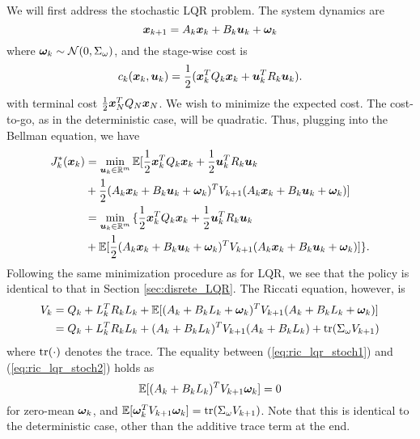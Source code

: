 We will first address the stochastic LQR problem. The system dynamics are
\begin{equation}
    \bm{x}_{k+1} = A_k \bm{x}_k + B_k \bm{u}_k + \bm{\omega}_{k}
\end{equation}
where $\bm{\omega}_{k} \sim \mathcal{N}(0, \Sigma_{\omega})$, and the stage-wise cost is 
\begin{equation}
    c_k(\bm{x}_k,\bm{u}_k) = \frac{1}{2} ( \bm{x}_k^T Q_k \bm{x}_k + \bm{u}_k^T R_k \bm{u}_k).
\end{equation}
with terminal cost $\frac{1}{2}\bm{x}_N^T Q_N \bm{x}_N$. We wish to minimize the expected cost. The cost-to-go, as in the deterministic case, will be quadratic. Thus, plugging into the Bellman equation, we have 
\begin{align}
\label{eq:LQR_rec_cost_stoch}
    J_{k}^*(\bm{x}_{k}) &=  \min_{\bm{u}_{k} \in \mathbb{R}^m} \mathbb{E} {\Large[} 
    \frac{1}{2} \bm{x}_{k}^T Q_{k} \bm{x}_{k} + \frac{1}{2} \bm{u}_{k}^T R_{k} \bm{u}_{k}\\
    &+ \frac{1}{2} (A_{k} \bm{x}_{k} + B_{k} \bm{u}_{k} + \bm{\omega}_{k})^T V_{k+1} (A_{k} \bm{x}_{k} + B_{k} \bm{u}_{k} + \bm{\omega}_{k}) \nonumber {\Large]} \nonumber\\
    &= \min_{\bm{u}_{k} \in \mathbb{R}^m} {\Large\{} 
    \frac{1}{2} \bm{x}_{k}^T Q_{k} \bm{x}_{k} + \frac{1}{2} \bm{u}_{k}^T R_{k} \bm{u}_{k} \\
    &+ \mathbb{E} {\Large[} \frac{1}{2} (A_{k} \bm{x}_{k} + B_{k} \bm{u}_{k} + \bm{\omega}_{k})^T V_{k+1} (A_{k} \bm{x}_{k} + B_{k} \bm{u}_{k} + \bm{\omega}_{k}) \nonumber {\Large]} {\Large\}}. \nonumber
\end{align}
Following the same minimization procedure as for LQR, we see that the policy is identical to that in Section \ref{sec:disrete_LQR}. The Riccati equation, however, is
\begin{align}
    V_k &= Q_k + L_k^T R_k L_k + \mathbb{E}[(A_{k}+ B_{k} L_k + \bm{\omega}_{k})^T V_{k+1} (A_{k} + B_{k} L_k + \bm{\omega}_{k})] \label{eq:ric_lqr_stoch1}\\
    &= Q_{k}  + L_{k}^T R_{k} L_{k} + (A_{k} + B_{k} L_{k})^T V_{k+1}   (A_{k} + B_{k} L_{k}) + \text{tr}(\Sigma_{\omega} V_{k+1}) \label{eq:ric_lqr_stoch2}
\end{align}
where $\text{tr}(\cdot)$ denotes the trace. The equality between (\ref{eq:ric_lqr_stoch1}) and (\ref{eq:ric_lqr_stoch2}) holds as 
\begin{equation}
    \mathbb{E}[(A_{k} + B_{k} L_{k})^T V_{k+1} \bm{\omega}_{k}] = 0
\end{equation} 
for zero-mean $\bm{\omega}_{k}$, and $\mathbb{E}[\bm{\omega}_{k}^T V_{k+1} \bm{\omega}_{k}] = \text{tr}(\Sigma_{\omega} V_{k+1})$. Note that this is identical to the deterministic case, other than the additive trace term at the end. 

